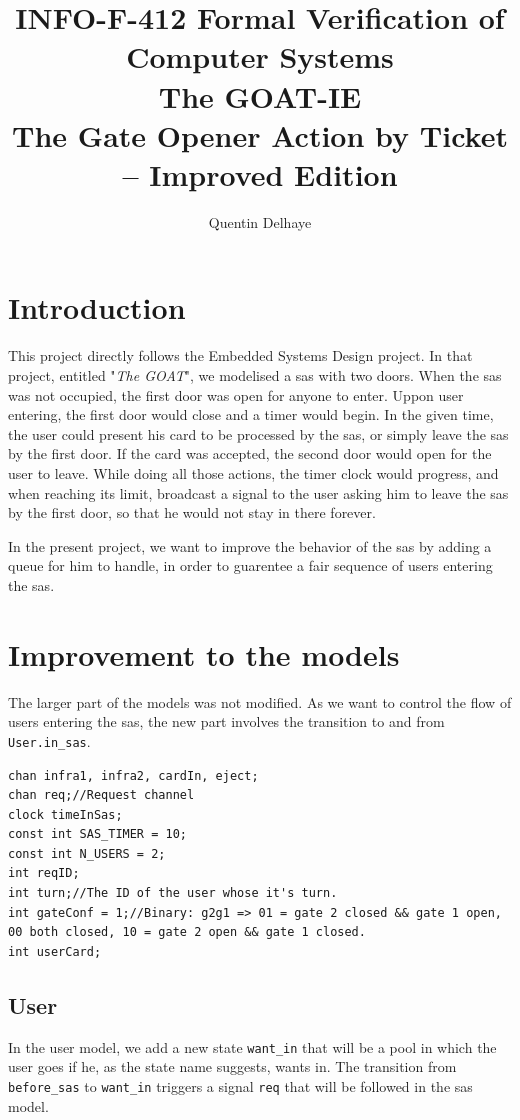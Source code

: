 \documentclass[10pt,a4paper]{article}
\title{INFO-F-412 Formal Verification of Computer Systems\\The GOAT-IE\\ \large{The Gate Opener Action by Ticket -- Improved Edition}}
\author{Quentin Delhaye}
\begin{document}
 
\maketitle

\section{Introduction}
This project directly follows the Embedded Systems Design project.
In that project, entitled "\textit{The GOAT}", we modelised a sas with two doors.
When the sas was not occupied, the first door was open for anyone to enter.
Uppon user entering, the first door would close and a timer would begin.
In the given time, the user could present his card to be processed by the sas, or simply leave the sas by the first door.
If the card was accepted, the second door would open for the user to leave.
While doing all those actions, the timer clock would progress, and when reaching its limit, broadcast a signal to the user asking him to leave the sas by the first door, so that he would not stay in there forever.

In the present project, we want to improve the behavior of the sas by adding a queue for him to handle, in order to guarentee a fair sequence of users entering the sas.

\section{Improvement to the models}
The larger part of the models was not modified.
As we want to control the flow of users entering the sas, the new part involves the transition to and from \texttt{User.in\_sas}.

\begin{lstlisting}[caption=Global system declarations., label=lst:globalDecl]
chan infra1, infra2, cardIn, eject;
chan req;//Request channel
clock timeInSas;
const int SAS_TIMER = 10;
const int N_USERS = 2;
int reqID;
int turn;//The ID of the user whose it's turn.
int gateConf = 1;//Binary: g2g1 => 01 = gate 2 closed && gate 1 open, 00 both closed, 10 = gate 2 open && gate 1 closed.
int userCard;
\end{lstlisting}

\subsection{User}
In the user model, we add a new state \texttt{want\_in} that will be a pool in which the user goes if he, as the state name suggests, wants in.
The transition from \texttt{before\_sas} to \texttt{want\_in} triggers a signal \texttt{req} that will be followed in the sas model.
\end{document}
